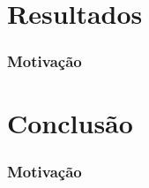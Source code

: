 \documentclass{beamer}
\begin{document}
\section{Resultados}

\begin{frame}

\frametitle{Motivação}

\end{frame}

\section{Conclusão}

\begin{frame}

\frametitle{Motivação}

\end{frame}
\end{document}
